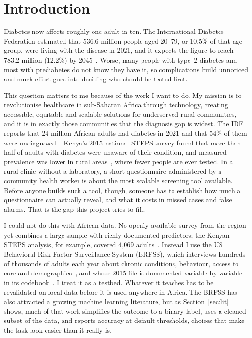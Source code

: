 \section{Introduction}
\label{sec:intro}

Diabetes now affects roughly one adult in ten. The International Diabetes Federation estimated that 536.6 million people aged 20--79, or 10.5\% of that age group, were living with the disease in 2021, and it expects the figure to reach 783.2 million (12.2\%) by 2045~\cite{idf2022}. Worse, many people with type~2 diabetes and most with prediabetes do not know they have it, so complications build unnoticed and much effort goes into deciding who should be tested first.

This question matters to me because of the work I want to do. My mission is to revolutionise healthcare in sub-Saharan Africa through technology, creating accessible, equitable and scalable solutions for underserved rural communities, and it is in exactly those communities that the diagnosis gap is widest. The IDF reports that 24 million African adults had diabetes in 2021 and that 54\% of them were undiagnosed~\cite{idfafrica2021}. Kenya's 2015 national STEPS survey found that more than half of adults with diabetes were unaware of their condition, and measured prevalence was lower in rural areas~\cite{mohamed2018}, where fewer people are ever tested. In a rural clinic without a laboratory, a short questionnaire administered by a community health worker is about the most scalable screening tool available. Before anyone builds such a tool, though, someone has to establish how much a questionnaire can actually reveal, and what it costs in missed cases and false alarms. That is the gap this project tries to fill.

I could not do this with African data. No openly available survey from the region yet combines a large sample with richly documented predictors; the Kenyan STEPS analysis, for example, covered 4,069 adults~\cite{mohamed2018}. Instead I use the US Behavioral Risk Factor Surveillance System (BRFSS), which interviews hundreds of thousands of adults each year about chronic conditions, behaviour, access to care and demographics~\cite{cdc2015data}, and whose 2015 file is documented variable by variable in its codebook~\cite{cdc2015codebook}. I treat it as a testbed. Whatever it teaches has to be revalidated on local data before it is used anywhere in Africa. The BRFSS has also attracted a growing machine learning literature, but as Section~\ref{sec:lit} shows, much of that work simplifies the outcome to a binary label, uses a cleaned subset of the data, and reports accuracy at default thresholds, choices that make the task look easier than it really is.

